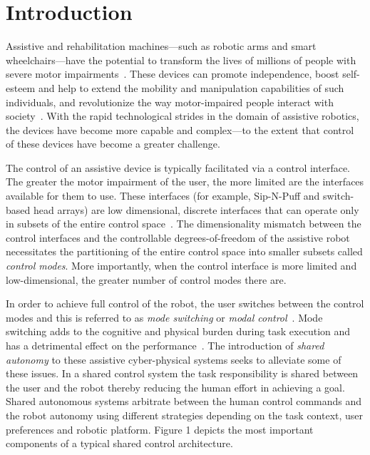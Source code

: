 \section{Introduction}\label{sec:intro}

Assistive and rehabilitation machines---such as robotic arms and smart wheelchairs---have the potential to transform the lives of millions of people with severe motor impairments~\cite{laplante1992assistive}. These devices can promote independence, boost self-esteem and help to extend the mobility and manipulation capabilities of such individuals, and revolutionize the way motor-impaired people interact with society~\cite{scherer1996outcomes, huete2012personal}. With the rapid technological strides in the domain of assistive robotics, the devices have become more capable and complex---to the extent that control of these devices have become a greater challenge. 

The control of an assistive device is typically facilitated via a control interface. The greater the motor impairment of the user, the more limited are the interfaces available for them to use. These interfaces (for example, Sip-N-Puff and switch-based head arrays) are low dimensional, discrete interfaces that can operate only in subsets of the entire control space~\cite{simpson2008tooth, nuttin2002selection}. 
The dimensionality mismatch between the control interfaces and the controllable degrees-of-freedom of the assistive robot necessitates the partitioning of the entire control space into smaller subsets called \textit{control modes}. More importantly, when the control interface is more limited and low-dimensional, the greater number of control modes there are. 

In order to achieve full control of the robot, the user switches between the control modes and this is referred to as \textit{mode switching} or \textit{modal control}~\cite{herlant2016assistive}. Mode switching adds to the cognitive and physical burden during task execution and has a detrimental effect on the performance~\cite{eftring1999technical}. The introduction of \textit{shared autonomy} to these assistive cyber-physical systems seeks to alleviate some of these issues. In a shared control system the task responsibility is shared between the user and the robot thereby reducing the human effort in achieving a goal. Shared autonomous systems arbitrate between the human control commands and the robot autonomy using different strategies depending on the task context, user preferences and robotic platform. Figure 1 depicts the most important components of a  typical shared control architecture.

